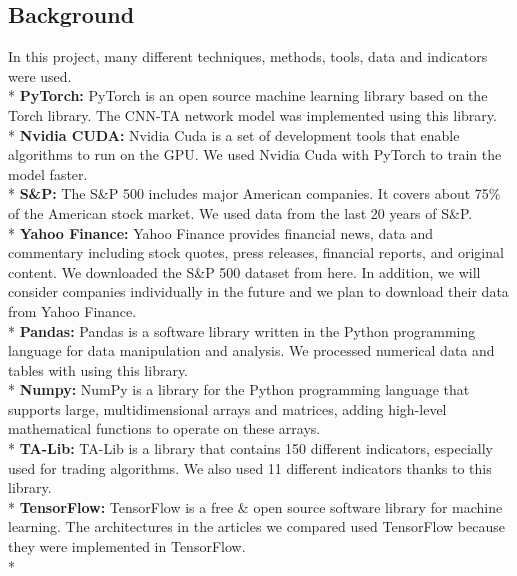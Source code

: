 \documentclass{article}
\begin{document}
\begin{center}
    \item\section{Background}
\end{center}
In this project, many different techniques, methods, tools, data and indicators were used.\vspace{0.25cm} \\*
\textbf{PyTorch:} PyTorch is an open source machine learning library based on the Torch library. The CNN-TA network model was implemented using this library.\vspace{0.1cm}\\*
\textbf{Nvidia CUDA:} Nvidia Cuda is a set of development tools that enable algorithms to run on the GPU. We used Nvidia Cuda with PyTorch to train the model faster.\vspace{0.1cm}\\*
\textbf{S\&P:} The S\&P 500 includes major American companies. It covers about 75\% of the American stock market. We used data from the last 20 years of S\&P.\vspace{0.1cm}\\*
\textbf{Yahoo Finance:} Yahoo Finance provides financial news, data and commentary including stock quotes, press releases, financial reports, and original content. We downloaded the S\&P 500 dataset from here. In addition, we will consider companies individually in the future and we plan to download their data from Yahoo Finance.\vspace{0.1cm}\\*
\textbf{Pandas:} Pandas is a software library written in the Python programming language for data manipulation and analysis. We processed numerical data and tables with using this library.\vspace{0.1cm}\\*
\textbf{Numpy:} NumPy is a library for the Python programming language that supports large, multidimensional arrays and matrices, adding high-level mathematical functions to operate on these arrays.\vspace{0.1cm}\\*
\textbf{TA-Lib:} TA-Lib is a library that contains 150 different indicators, especially used for trading algorithms. We also used 11 different indicators thanks to this library.\vspace{0.1cm}\\*
\textbf{TensorFlow:} TensorFlow is a free \& open source software library for machine learning. The architectures in the articles we compared used TensorFlow because they were implemented in TensorFlow.\vspace{0.1cm}\\*
\end{document}
